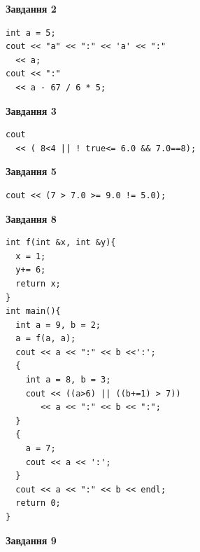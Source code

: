 \documentclass[12pt, ukrainian]{article}
\begin{document}
{\begin {large}
\begin{minipage}[t]{7.0cm}
\end{minipage}
\vline \hspace{1mm}
\begin{minipage}[t]{11.0cm}

\begin{center}
\textbf{Завдання 2}
\end{center}
\vspace{-8mm}

\begin{verbatim}
int a = 5;
cout << "a" << ":" << 'a' << ":" 
  << a;
cout << ":" 
  << a - 67 / 6 * 5;
\end{verbatim}



\begin{center}
\textbf{Завдання 3}
\end{center}
\vspace{-8mm}

\begin{verbatim}
cout 
  << ( 8<4 || ! true<= 6.0 && 7.0==8);
\end{verbatim}



\begin{center}
\textbf{Завдання 5}
\end{center}
\vspace{-8mm}

\begin{verbatim}
cout << (7 > 7.0 >= 9.0 != 5.0);
\end{verbatim}



\begin{center}
\textbf{Завдання 8}
\end{center}
\vspace{-8mm}

\begin{verbatim}
int f(int &x, int &y){
  x = 1;
  y+= 6;
  return x;
}
int main(){
  int a = 9, b = 2;
  a = f(a, a);
  cout << a << ":" << b <<':';
  {
    int a = 8, b = 3;
    cout << ((a>6) || ((b+=1) > 7))
       << a << ":" << b << ":";
  }
  {
    a = 7;
    cout << a << ':';
  }
  cout << a << ":" << b << endl;
  return 0;
}
\end{verbatim}

\end{minipage}


\begin{minipage}[t]{7.0cm}

\begin{center}
\textbf{Завдання 9}
\end{center}
\vspace{-8mm}


\end{minipage}
\end{large}}
\end{document}
